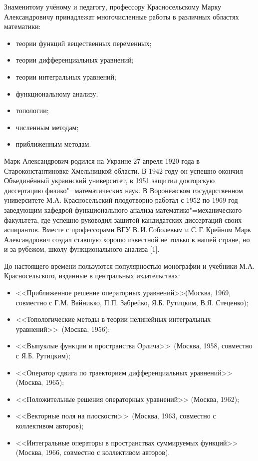 \vzmscaption

Знаменитому учёному и педагогу, профессору Красносельскому Марку Александровичу принадлежат многочисленные работы в различных
областях математики:
\begin{itemize}
\item теории функций вещественных переменных;
\item теории дифференциальных уравнений;
\item теории интегральных уравнений;
\item функциональному анализу;
\item топологии;
\item численным методам;
\item приближенным методам.
\end{itemize}

Марк Александрович родился на Украине 27 апреля 1920 года в Староконстантиновке Хмельницкой области. В 1942 году он успешно окончил
Объединённый украинский университет, в 1951 защитил докторскую диссертацию физико"=математических наук. В Воронежском государственном
университете М.А. Красносельский плодотворно работал с 1952 по 1969 год заведующим кафедрой функционального анализа
математико"=механического факультета, где успешно руководил защитой кандидатских диссертаций своих аспирантов. Вместе с профессорами
ВГУ В.\,И.\,Соболевым и С.\,Г.\,Крейном Марк Александрович создал ставшую хорошо известной не только в нашей стране, но и за рубежом,
школу функционального анализа [1].

До настоящего времени пользуются популярностью монографии и учебники М.А. Красносельского, изданные в центральных издательствах:
\begin{itemize}
\item <<Приближенное решение операторных уравнений>>\linebreak(Москва, 1969, совместно с Г.М. Вайникко, П.П. Забрейко, Я.Б. Рутицким,
В.Я. Стеценко);
\item <<Топологические методы в теории нелинейных интегральных уравнений>>\, (Москва, 1956);
\item <<Выпуклые функции и пространства Орлича>>\, (Мос\-к\-ва, 1958, совместно с Я.Б. Рутицким);
\item <<Оператор сдвига по траекториям дифференциальных уравнений>>\, (Москва, 1965);
\item <<Положительные решения операторных уравнений>> \linebreak(Москва, 1962);
\item <<Векторные поля на плоскости>>\, (Москва, 1963, совместно с коллективом авторов);
\item <<Интегральные операторы в пространствах суммируемых функций>>\, (Москва, 1966, совместно с коллективом авторов).
\end{itemize}

